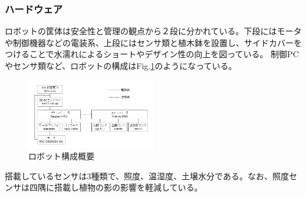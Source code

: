 \documentclass[10pt]{jsarticle}
\begin{document}
\subsubsection{ハードウェア}
ロボットの筐体は安全性と管理の観点から２段に分かれている。下段にはモータや制御機器などの電装系、上段にはセンサ類と植木鉢を設置し、サイドカバーをつけることで水濡れによるショートやデザイン性の向上を図っている。
制御PCやセンサ類など、ロボットの構成はFig.\ref{robot_hard}のようになっている。
\begin{figure}[t]
    \centering
    \includegraphics[width=0.5\textwidth]{img/hard.png}
    \caption{ロボット構成概要}
    \label{robot_hard}
\end{figure}
搭載しているセンサは3種類で、照度、温湿度、土壌水分である。なお、照度センサは四隅に搭載し植物の影の影響を軽減している。
\end{document}
